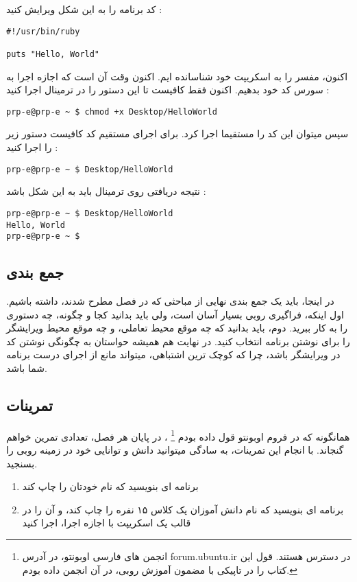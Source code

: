 \documentclass[11pt]{article}
\begin{document}
کد برنامه را به این شکل ویرایش کنید :
\begin{latin}
\begin{verbatim}
#!/usr/bin/ruby

puts "Hello, World"
\end{verbatim}
\end{latin}
اکنون، مفسر را به اسکریپت خود شناسانده ایم. اکنون وقت آن است که اجازه اجرا به سورس کد خود بدهیم. اکنون فقط کافیست تا این دستور را در ترمینال اجرا کنید :
\begin{latin}
\begin{verbatim}
prp-e@prp-e ~ $ chmod +x Desktop/HelloWorld 
\end{verbatim}
\end{latin}

سپس میتوان این کد را مستقیما اجرا کرد. برای اجرای مستقیم کد کافیست دستور زیر را اجرا کنید :
\begin{latin}
\begin{verbatim}
prp-e@prp-e ~ $ Desktop/HelloWorld 
\end{verbatim}
\end{latin}
نتیجه دریافتی روی ترمینال باید به این شکل باشد :
\begin{latin}
\begin{verbatim}
prp-e@prp-e ~ $ Desktop/HelloWorld 
Hello, World
prp-e@prp-e ~ $ 
\end{verbatim}
\end{latin}
\subsection{جمع بندی}
در اینجا، باید یک جمع بندی نهایی از مباحثی که در فصل مطرح شدند، داشته باشیم. اول اینکه، فراگیری روبی بسیار آسان است، ولی باید بدانید کجا و چگونه، چه دستوری را به کار ببرید. دوم، باید بدانید که چه موقع محیط تعاملی، و چه موقع محیط ویرایشگر را برای نوشتن برنامه انتخاب کنید. در نهایت هم همیشه حواستان به چگونگی نوشتن کد در ویرایشگر باشد، چرا که کوچک ترین اشتباهی، میتواند مانع از اجرای درست برنامه شما باشد. 
\subsection{تمرینات}
همانگونه که در فروم اوبونتو قول داده بودم
\footnote{انجمن های فارسی اوبونتو، در آدرس forum.ubuntu.ir در دسترس هستند. قول این کتاب را در تاپیکی با مضمون آموزش روبی، در آن انجمن داده بودم. }
، در پایان هر فصل، تعدادی تمرین خواهم گنجاند. با انجام این تمرینات، به سادگی میتوانید دانش و توانایی خود در زمینه روبی را بسنجید.
\begin{enumerate}
\item برنامه ای بنویسید که نام خودتان را چاپ کند
\item برنامه ای بنویسید که نام دانش آموزان یک کلاس ۱۵ نفره را چاپ کند، و آن را در قالب یک اسکریپت با اجازه اجرا، اجرا کنید
\end{enumerate}
\newpage{}
\end{document}

